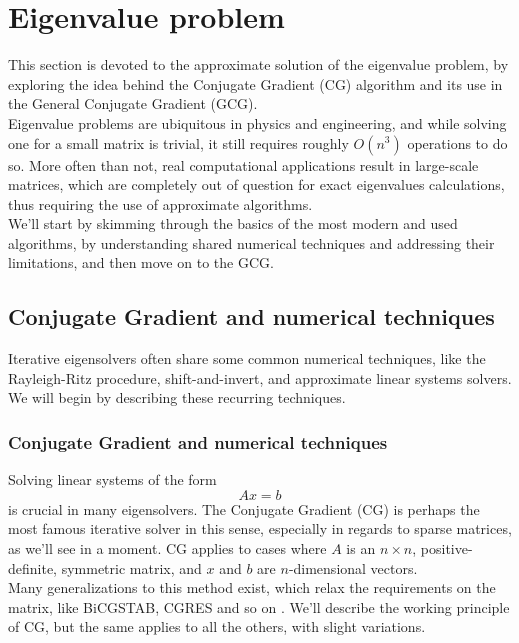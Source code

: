 \section{Eigenvalue problem}
This section is devoted to the approximate solution of the eigenvalue problem, by exploring the idea behind the Conjugate Gradient (CG) algorithm and its use in the General Conjugate Gradient (GCG).
\\Eigenvalue problems are ubiquitous in physics and engineering, and while solving one for a small matrix is trivial, it still requires roughly $O(n^3)$ \cite{golub13} operations to do so. More often than not, real computational applications result in large-scale matrices, which are completely out of question for exact eigenvalues calculations, thus requiring the use of approximate algorithms. 
\\We'll start by skimming through the basics of the most modern and used algorithms, by understanding shared numerical techniques and addressing their limitations, and then move on to the GCG.
\subsection{Conjugate Gradient and numerical techniques}
Iterative eigensolvers often share some common numerical techniques, like the Rayleigh-Ritz procedure, shift-and-invert, and approximate linear systems solvers. 
We will begin by describing these recurring techniques.
\subsubsection{Conjugate Gradient and numerical techniques}
Solving linear systems of the form
\begin{equation}
    \label{eq:lin_sys}
    Ax = b
\end{equation}
is crucial in many eigensolvers. The Conjugate Gradient (CG) is perhaps the most famous iterative solver in this sense, especially in regards to sparse matrices, as we'll see in a moment.
CG applies to cases where $A$ is an $n\times n$, positive-definite, symmetric matrix, and $x$ and $b$ are $n$-dimensional vectors.
\\Many generalizations to this method exist, which relax the requirements on the matrix, like BiCGSTAB, CGRES and so on \cite{Saad1992}. We'll describe the working principle of CG, but the same applies to all the others, with slight variations.
